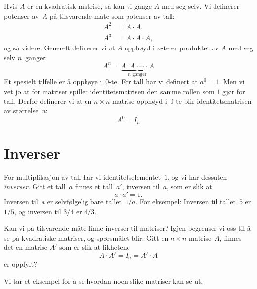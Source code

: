 Hvis $A$ er en kvadratisk matrise, så kan vi gange $A$ med seg selv.
Vi definerer potenser av~$A$ på tilsvarende måte som potenser av tall:
\begin{align*}
A^2 &= A \cdot A, \\
A^3 &= A \cdot A \cdot A,
\end{align*}
og så videre.  Generelt definerer vi at $A$ opphøyd i $n$-te er
produktet av $A$ med seg selv $n$~ganger:
\[
A^n = \underbrace{A \cdot A \cdot \cdots \cdot A}_{\text{$n$~ganger}}
\]
Et spesielt tilfelle er å opphøye i~$0$-te.  For tall har vi definert
at $a^0 = 1$.  Men vi vet jo at for matriser spiller
identitetsmatrisen den samme rollen som $1$ gjør for tall.  Derfor
definerer vi at en $n \times n$-matrise opphøyd i~$0$-te blir
identitetsmatrisen av størrelse~$n$:
\[
A^0 = I_n
\]


\section*{Inverser}

For multiplikasjon av tall har vi identitetselementet~$1$, og vi har
dessuten \emph{inverser}.  Gitt et tall~$a$ finnes et tall~$a'$,
inversen til~$a$, som er slik at
\[
a \cdot a' = 1.
\]
Inversen til~$a$ er selvfølgelig bare tallet~$1/a$.  For eksempel:
Inversen til tallet~$5$ er $1/5$, og inversen til $3/4$ er $4/3$.

Kan vi på tilsvarende måte finne inverser til matriser?  Igjen
begrenser vi oss til å se på kvadratiske matriser, og spørsmålet blir:
Gitt en $n \times n$-matrise~$A$, finnes det en matrise $A'$ som er
slik at likhetene
\[
A \cdot A' = I_n = A' \cdot A
\]
er oppfylt?

Vi tar et eksempel for å se hvordan noen slike matriser kan se ut.


